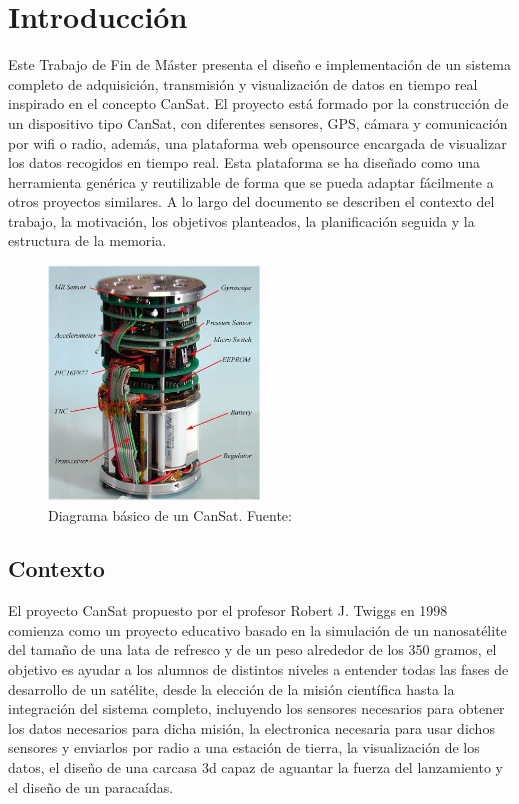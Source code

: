 \chapter{Introducción}

\label{cap:introduccion}
Este Trabajo de Fin de Máster presenta el diseño e implementación de un sistema completo de adquisición, transmisión y visualización de datos en tiempo real inspirado en el concepto CanSat.
El proyecto está formado por la construcción de un dispositivo tipo CanSat, con diferentes sensores, GPS, cámara y comunicación por wifi o radio,
además, una plataforma web opensource encargada de visualizar los datos recogidos en tiempo real.
Esta plataforma se ha diseñado como una herramienta genérica y reutilizable de forma que se pueda adaptar fácilmente a otros proyectos similares.
A lo largo del documento se describen el contexto del trabajo, la motivación, los objetivos planteados, la planificación seguida y la estructura de la memoria.

\begin{figure}
    \centering
    \includegraphics[width=0.5\textwidth]{Imagenes/Bitmap/cansat}
    \caption{Diagrama básico de un CanSat. Fuente: \cite{researchgate_cansat2018}}
    \label{fig:cansat}
\end{figure}


\section{Contexto}
El proyecto CanSat propuesto por el profesor Robert J. Twiggs en 1998~\cite{jaxa_cansat} comienza como un proyecto educativo basado en la simulación de un nanosatélite del tamaño de una lata de refresco y de un peso alrededor de los 350 gramos,
el objetivo es ayudar a los alumnos de distintos niveles a entender todas las fases de desarrollo de un satélite, desde la elección de la misión científica hasta la integración del sistema completo,
incluyendo los sensores necesarios para obtener los datos necesarios para dicha misión, la electronica necesaria para usar dichos sensores y enviarlos por radio a una estación de tierra,
la visualización de los datos, el diseño de una carcasa 3d capaz de aguantar la fuerza del lanzamiento y el diseño de un paracaídas.


